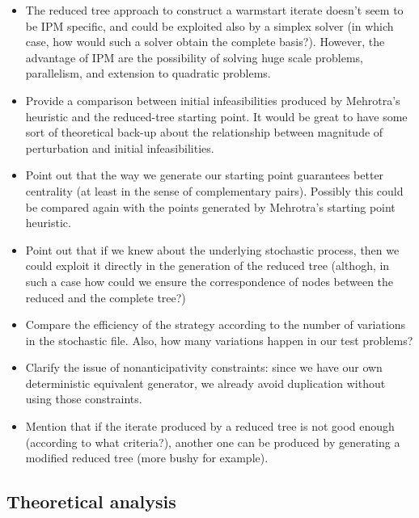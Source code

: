 \begin{itemize}
\item The reduced tree approach to construct a warmstart iterate 
doesn't seem to be IPM specific, and could be exploited also by a 
simplex solver (in which case, how would such a solver obtain the 
complete basis?). However, the advantage of IPM are the possibility 
of solving huge scale problems, parallelism, and extension to 
quadratic problems.

\item Provide a comparison between initial infeasibilities 
produced by Mehrotra's heuristic and the reduced-tree starting 
point. It would be great to have some sort of theoretical back-up 
about the relationship between magnitude of perturbation and 
initial infeasibilities.

\item Point out that the way we generate our starting point 
guarantees better centrality (at least in the sense of 
complementary pairs). Possibly this could be compared again 
with the points generated by Mehrotra's starting point heuristic.

\item Point out that if we knew about the underlying 
stochastic process, then we could exploit it directly in the 
generation of the reduced tree (althogh, in such a case how 
could we ensure the correspondence of nodes between the reduced 
and the complete tree?)

\item Compare the efficiency of the strategy according to the 
number of variations in the stochastic file. Also, how many 
variations happen in our test problems?

\item Clarify the issue of nonanticipativity constraints: 
since we have our own deterministic equivalent generator, we 
already avoid duplication without using those constraints.


\item Mention that if the iterate produced by a reduced tree 
is not good enough (according to what criteria?), another one 
can be produced by generating a modified reduced tree (more 
bushy for example).
\end{itemize}


\subsection{Theoretical analysis}

